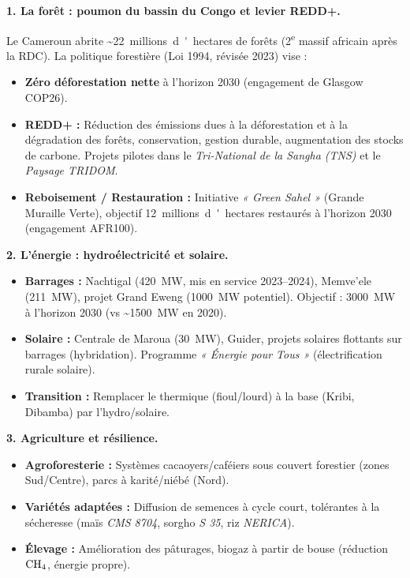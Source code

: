 \documentclass[11pt]{article}
\begin{document}
\textbf{1. La forêt : poumon du bassin du Congo et levier REDD+.} \par
Le Cameroun abrite \textasciitilde \SI{22}{millions d'hectares} de forêts (2\textsuperscript{e} massif africain après la RDC). La politique forestière (Loi 1994, révisée 2023) vise :
\begin{itemize}
    \item \textbf{Zéro déforestation nette} à l'horizon 2030 (engagement de Glasgow COP26).
    \item \textbf{REDD+ :} Réduction des émissions dues à la déforestation et à la dégradation des forêts, conservation, gestion durable, augmentation des stocks de carbone. Projets pilotes dans le \emph{Tri-National de la Sangha (TNS)} et le \emph{Paysage TRIDOM}.
    \item \textbf{Reboisement / Restauration :} Initiative \emph{« Green Sahel »} (Grande Muraille Verte), objectif \SI{12}{millions d'hectares} restaurés à l'horizon 2030 (engagement AFR100).
\end{itemize}

\textbf{2. L'énergie : hydroélectricité et solaire.} \par
\begin{itemize}
    \item \textbf{Barrages :} Nachtigal (\SI{420}{MW}, mis en service 2023--2024), Memve'ele (\SI{211}{MW}), projet Grand Eweng (\SI{1000}{MW} potentiel). Objectif : \SI{3000}{MW} à l'horizon 2030 (vs \textasciitilde \SI{1500}{MW} en 2020).
    \item \textbf{Solaire :} Centrale de Maroua (\SI{30}{MW}), Guider, projets solaires flottants sur barrages (hybridation). Programme \emph{« Énergie pour Tous »} (électrification rurale solaire).
    \item \textbf{Transition :} Remplacer le thermique (fioul/lourd) à la base (Kribi, Dibamba) par l'hydro/solaire.
\end{itemize}

\textbf{3. Agriculture et résilience.} \par
\begin{itemize}
    \item \textbf{Agroforesterie :} Systèmes cacaoyers/caféiers sous couvert forestier (zones Sud/Centre), parcs à karité/niébé (Nord).
    \item \textbf{Variétés adaptées :} Diffusion de semences à cycle court, tolérantes à la sécheresse (maïs \emph{CMS 8704}, sorgho \emph{S 35}, riz \emph{NERICA}).
    \item \textbf{Élevage :} Amélioration des pâturages, biogaz à partir de bouse (réduction $\ce{CH4}$, énergie propre).
\end{itemize}
\end{document}

